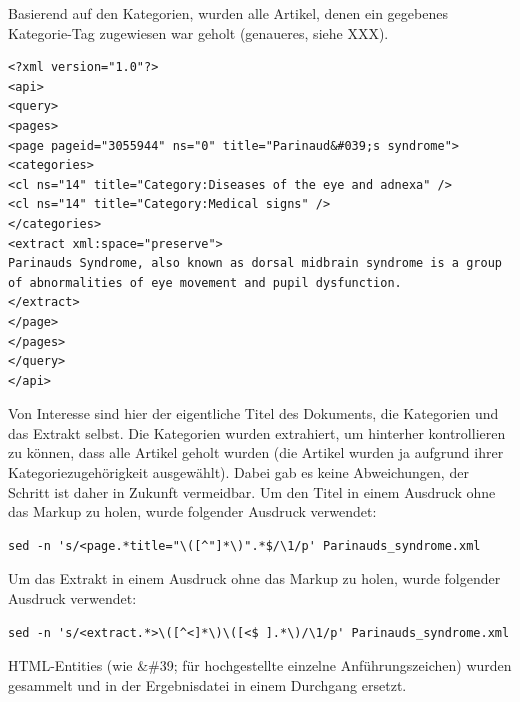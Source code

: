 \documentclass[pagesize,DIV=calc,12pt,draft]{scrreprt}
\begin{document}
Basierend auf den Kategorien, wurden alle Artikel, denen ein gegebenes Kategorie-Tag zugewiesen war geholt (genaueres, siehe XXX).

\lstset{
language=XML
}

\begin{lstlisting}
<?xml version="1.0"?>
<api>
<query>
<pages>
<page pageid="3055944" ns="0" title="Parinaud&#039;s syndrome">
<categories>
<cl ns="14" title="Category:Diseases of the eye and adnexa" />
<cl ns="14" title="Category:Medical signs" />
</categories>
<extract xml:space="preserve">
Parinauds Syndrome, also known as dorsal midbrain syndrome is a group of abnormalities of eye movement and pupil dysfunction.
</extract>
</page>
</pages>
</query>
</api>
\end{lstlisting}

Von Interesse sind hier der eigentliche Titel des Dokuments, die Kategorien und das Extrakt selbst. 
Die Kategorien wurden extrahiert, um hinterher kontrollieren zu können, dass alle Artikel geholt wurden (die Artikel wurden ja aufgrund ihrer Kategoriezugehörigkeit ausgewählt). 
Dabei gab es keine Abweichungen, der Schritt ist daher in Zukunft vermeidbar. 
Um den Titel in einem Ausdruck ohne das Markup zu holen, wurde folgender Ausdruck verwendet: 

\lstset{
language=bash
}

\begin{lstlisting}
sed -n 's/<page.*title="\([^"]*\)".*$/\1/p' Parinauds_syndrome.xml
\end{lstlisting}

Um das Extrakt in einem Ausdruck ohne das Markup zu holen, wurde
folgender Ausdruck verwendet:

\begin{lstlisting}
sed -n 's/<extract.*>\([^<]*\)\([<$ ].*\)/\1/p' Parinauds_syndrome.xml
\end{lstlisting}

HTML-Entities (wie \&\#39; für hochgestellte einzelne Anführungszeichen) wurden gesammelt und in der Ergebnisdatei in einem Durchgang ersetzt.
\end{document}
